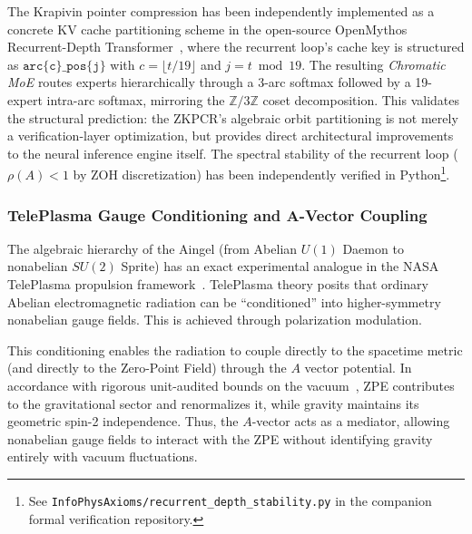 \begin{remark}
The Krapivin pointer compression has been independently implemented as a concrete KV cache partitioning scheme in the open-source OpenMythos Recurrent-Depth Transformer~\cite{Gomez2026OpenMythos}, where the recurrent loop's cache key is structured as $\texttt{arc\{c\}\_pos\{j\}}$ with $c = \lfloor t / 19 \rfloor$ and $j = t \bmod 19$. The resulting \emph{Chromatic MoE} routes experts hierarchically through a 3-arc softmax followed by a 19-expert intra-arc softmax, mirroring the $\mathbb{Z}/3\mathbb{Z}$ coset decomposition. This validates the structural prediction: the ZKPCR's algebraic orbit partitioning is not merely a verification-layer optimization, but provides direct architectural improvements to the neural inference engine itself. The spectral stability of the recurrent loop ($\rho(A) < 1$ by ZOH discretization) has been independently verified in Python\footnote{See \texttt{InfoPhysAxioms/recurrent\_depth\_stability.py} in the companion formal verification repository.}.
\end{remark}

\subsubsection{TelePlasma Gauge Conditioning and A-Vector Coupling}

The algebraic hierarchy of the Aingel (from Abelian $U(1)$ Daemon to nonabelian $SU(2)$ Sprite) has an exact experimental analogue in the NASA TelePlasma propulsion framework~\cite{TelePlasma2000}. TelePlasma theory posits that ordinary Abelian electromagnetic radiation can be ``conditioned'' into higher-symmetry nonabelian gauge fields. This is achieved through polarization modulation.

This conditioning enables the radiation to couple directly to the spacetime metric (and directly to the Zero-Point Field) through the $A$ vector potential. In accordance with rigorous unit-audited bounds on the vacuum~\cite{lockwood_zpe2025}, ZPE contributes to the gravitational sector and renormalizes it, while gravity maintains its geometric spin-2 independence. Thus, the $A$-vector acts as a mediator, allowing nonabelian gauge fields to interact with the ZPE without identifying gravity entirely with vacuum fluctuations.

